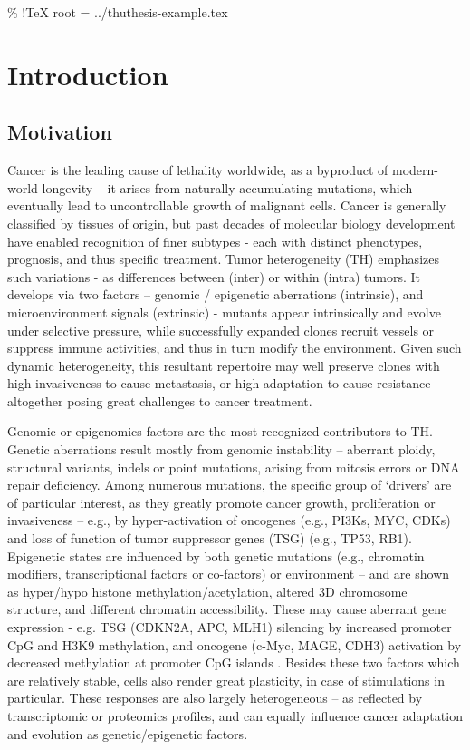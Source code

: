 \% !TeX root = ../thuthesis-example.tex
\noindent
\chapter{Introduction}

\section{Motivation}

Cancer is the leading cause of lethality worldwide, as a byproduct of modern-world longevity – it arises from naturally accumulating mutations, which eventually lead to uncontrollable growth of malignant cells. Cancer is generally classified by tissues of origin, but past decades of molecular biology development have enabled recognition of finer subtypes - each with distinct phenotypes, prognosis, and thus specific treatment. Tumor heterogeneity (TH) emphasizes such variations - as differences between (inter) or within (intra) tumors. It develops via two factors – genomic / epigenetic aberrations (intrinsic), and microenvironment signals (extrinsic) - mutants appear intrinsically and evolve under selective pressure, while successfully expanded clones recruit vessels or suppress immune activities, and thus in turn modify the environment. Given such dynamic heterogeneity, this resultant repertoire may well preserve clones with high invasiveness  to cause metastasis, or high adaptation to cause resistance -altogether posing great challenges to cancer treatment.

Genomic or epigenomics factors are the most recognized contributors to TH. Genetic aberrations result mostly from genomic instability – aberrant ploidy, structural variants, indels or point mutations, arising from mitosis errors or DNA repair deficiency. Among numerous mutations, the specific group of ‘drivers’ are of particular interest, as they greatly promote cancer growth, proliferation or invasiveness – e.g., by hyper-activation of oncogenes (e.g., PI3Ks, MYC, CDKs) and loss of function of tumor suppressor genes (TSG) (e.g., TP53, RB1). Epigenetic states are influenced by both genetic mutations (e.g., chromatin modifiers, transcriptional factors or co-factors) or environment – and are shown as hyper/hypo histone methylation/acetylation, altered 3D chromosome structure, and different chromatin accessibility. These may cause aberrant gene expression - e.g. TSG (CDKN2A, APC, MLH1) silencing by increased promoter CpG and H3K9 methylation, and oncogene (c-Myc, MAGE, CDH3) activation by decreased methylation at promoter CpG islands \citep{cheung2009dna}. Besides these two factors which are relatively stable, cells also render great plasticity, in case of stimulations in particular. These responses are also largely heterogeneous – as reflected by transcriptomic or proteomics profiles, and can equally influence cancer adaptation and evolution as genetic/epigenetic factors.

